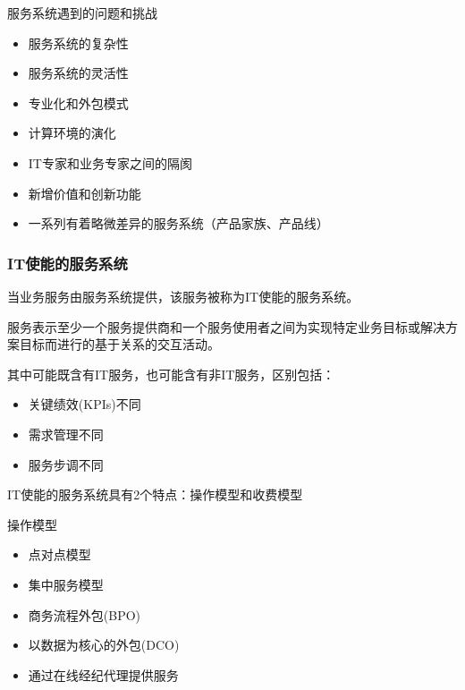 服务系统遇到的问题和挑战
\vspace{-0.8em}
\begin{multicols}{2}
    \begin{itemize}
        \item 服务系统的复杂性
        \item 服务系统的灵活性
        \item 专业化和外包模式
        \item 计算环境的演化
        \item IT专家和业务专家之间的隔阂
        \item 新增价值和创新功能
        \item 一系列有着略微差异的服务系统（产品家族、产品线） 
    \end{itemize}
\end{multicols}
\vspace{-1em}

\subsubsection{IT使能的服务系统}
当业务服务由服务系统提供，该服务被称为IT使能的服务系统。

服务表示至少一个服务提供商和一个服务使用者之间为实现特定业务目标或解决方案目标而进行的基于关系的交互活动。

其中可能既含有IT服务，也可能含有非IT服务，区别包括：
\vspace{-0.8em}
\begin{multicols}{3}
    \begin{itemize}
        \item 关键绩效(KPIs)不同
        \item 需求管理不同
        \item 服务步调不同
    \end{itemize}
\end{multicols}
\vspace{-1em}

IT使能的服务系统具有2个特点：操作模型和收费模型

操作模型
\vspace{-0.8em}
\begin{multicols}{3}
    \begin{itemize}
        \item 点对点模型
        \item 集中服务模型
        \item 商务流程外包(BPO)
        \item 以数据为核心的外包(DCO)
        \item 通过在线经纪代理提供服务
    \end{itemize}
\end{multicols}
\vspace{-1em}


